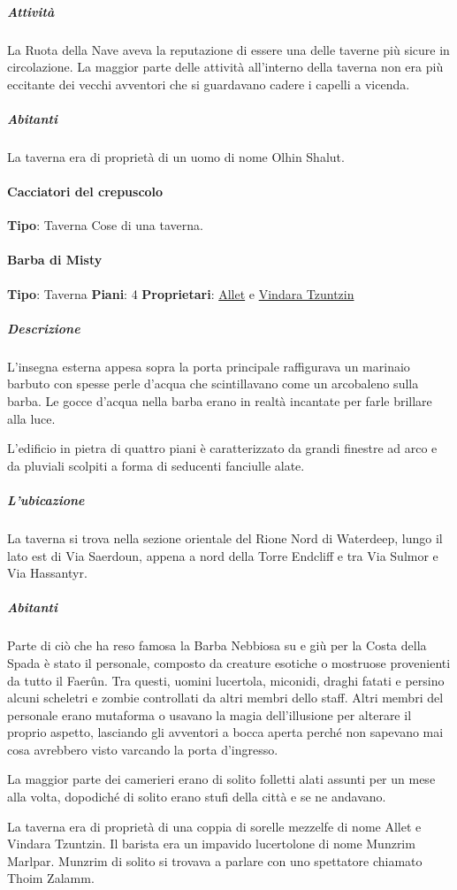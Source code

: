 \documentclass{article}
\begin{document}
\subparagraph{Attività}
La Ruota della Nave aveva la reputazione di essere una delle taverne più sicure in circolazione. La maggior parte delle attività all'interno della taverna non era più eccitante dei vecchi avventori che si guardavano cadere i capelli a vicenda.

\subparagraph{Abitanti}
La taverna era di proprietà di un uomo di nome Olhin Shalut.
\paragraph{Cacciatori del crepuscolo}
\textbf{Tipo}: Taverna
Cose di una taverna.
\paragraph{Barba di Misty}
\textbf{Tipo}: Taverna
\textbf{Piani}: 4
\textbf{Proprietari}: \hyperlink{https://forgottenrealms.fandom.com/wiki/Allet_Tzuntzin}{Allet} e  \hyperlink{https://forgottenrealms.fandom.com/wiki/Vindara_Tzuntzin}{Vindara Tzuntzin}
\subparagraph{Descrizione}
L'insegna esterna appesa sopra la porta principale raffigurava un marinaio barbuto con spesse perle d'acqua che scintillavano come un arcobaleno sulla barba. Le gocce d'acqua nella barba erano in realtà incantate per farle brillare alla luce.

L'edificio in pietra di quattro piani è caratterizzato da grandi finestre ad arco e da pluviali scolpiti a forma di seducenti fanciulle alate.

\subparagraph{L'ubicazione}
La taverna si trova nella sezione orientale del Rione Nord di Waterdeep, lungo il lato est di Via Saerdoun, appena a nord della Torre Endcliff e tra Via Sulmor e Via Hassantyr.

\subparagraph{Abitanti}
Parte di ciò che ha reso famosa la Barba Nebbiosa su e giù per la Costa della Spada è stato il personale, composto da creature esotiche o mostruose provenienti da tutto il Faerûn. Tra questi, uomini lucertola, miconidi, draghi fatati e persino alcuni scheletri e zombie controllati da altri membri dello staff. Altri membri del personale erano mutaforma o usavano la magia dell'illusione per alterare il proprio aspetto, lasciando gli avventori a bocca aperta perché non sapevano mai cosa avrebbero visto varcando la porta d'ingresso.

La maggior parte dei camerieri erano di solito folletti alati assunti per un mese alla volta, dopodiché di solito erano stufi della città e se ne andavano.

La taverna era di proprietà di una coppia di sorelle mezzelfe di nome Allet e Vindara Tzuntzin. Il barista era un impavido lucertolone di nome Munzrim Marlpar. Munzrim di solito si trovava a parlare con uno spettatore chiamato Thoim Zalamm.
\end{document}
